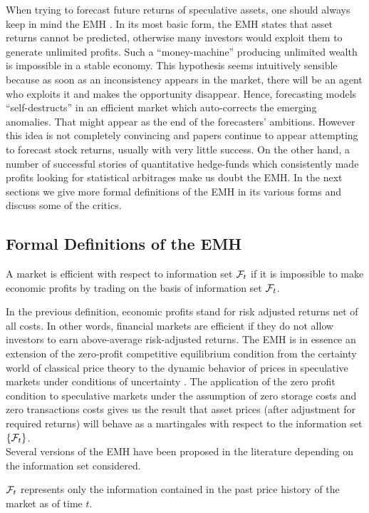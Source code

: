 When trying to forecast future returns of speculative assets, one should always keep in mind the \gls{EMH} \cite{timmermann2004efficient}. In its most basic form, the EMH states that asset returns cannot be predicted, otherwise many investors would exploit them to generate unlimited profits. Such a ``money-machine'' producing unlimited wealth is impossible in a stable economy. This hypothesis seems intuitively sensible because as soon as an inconsistency appears in the market, there will be an agent who exploits it and makes the opportunity disappear. Hence, forecasting models ``self-destructs'' in an efficient market which auto-corrects the emerging anomalies. That might appear as the end of the forecasters' ambitions. However this idea is not completely convincing and papers continue to appear attempting to forecast stock returns, usually with very little success. On the other hand, a number of successful stories of quantitative hedge-funds which consistently made profits looking for statistical arbitrages make us doubt the EMH. In the next sections we give more formal definitions of the EMH in its various forms and discuss some of the critics.

\subsection{Formal Definitions of the EMH}
\begin{definition}
	A market is efficient with respect to information set $\mathcal{F}_t$ if it is impossible to make economic profits by trading on the basis of information set $\mathcal{F}_t$.
\end{definition}
In the previous definition, economic profits stand for risk adjusted returns net of all costs. In other words, financial markets are efficient if they do not allow investors to earn above-average risk-adjusted returns. The EMH is in essence an extension of the zero-profit competitive equilibrium condition from the certainty world of classical price theory to the dynamic behavior of prices in speculative markets under conditions of uncertainty \cite{jensen1978some}. The application of the zero profit condition to speculative markets under the assumption of zero storage costs and zero transactions costs gives us the result that asset prices (after adjustment for required returns) will behave as a martingales with respect to the information set $\{\mathcal{F}_t\}$.\\
Several versions of the EMH have been proposed in the literature depending on the information set considered.
\begin{definition}
	$\mathcal{F}_t$ represents only the information contained in the past price history of the market as of time $t$. 
\end{definition}

